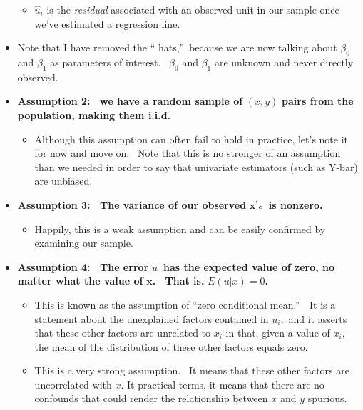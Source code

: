 \documentclass[11pt]{article}
\begin{document}
\begin{itemize}
\begin{itemize}
\item $\widehat{u}_{i}$ is the \textit{residual }associated with an observed
unit in our sample once we've estimated a regression line.
\end{itemize}

\item Note that I have removed the \textquotedblleft
hats,\textquotedblright\ because we are now talking about $\beta _{0}$ and $%
\beta _{1}$ as parameters of interest. \ $\beta _{0}$ and $\beta _{1}$ are
unknown and never directly observed.

\item \textbf{Assumption 2: \ we have a random sample of }$(x,y)$ \textbf{%
pairs from the population, making them i.i.d.}

\begin{itemize}
\item Although this assumption can often fail to hold in practice, let's
note it for now and move on. \ Note that this is no stronger of an
assumption than we needed in order to say that univariate estimators (such
as Y-bar) are unbiased.
\end{itemize}

\item \textbf{Assumption 3: \ The variance of our observed }$\mathbf{x}%
^{\prime }s$\textbf{\ is nonzero.}

\begin{itemize}
\item Happily, this is a weak assumption and can be easily confirmed by
examining our sample. \ 
\end{itemize}

\item \textbf{Assumption 4: \ The error }$u$\textbf{\ has the expected value
of zero, no matter what the value of }$\mathbf{x}$\textbf{. \ That is, }$%
E(u|x)=0$\textbf{. \ }

\begin{itemize}
\item This is known as the assumption of \textquotedblleft zero conditional
mean.\textquotedblright\ \ It is a statement about the unexplained factors
contained in $u_{i},$ and it asserts that these other factors are unrelated
to $x_{i}$ in that, given a value of $x_{i}$, the mean of the distribution
of these other factors equals zero.

\item This is a very strong assumption. \ It means that these other factors
are uncorrelated with $x$. It practical terms, it means that there are no
confounds that could render the relationship between $x$ and $y$ spurious.


\end{itemize}
\end{itemize}
\end{document}
